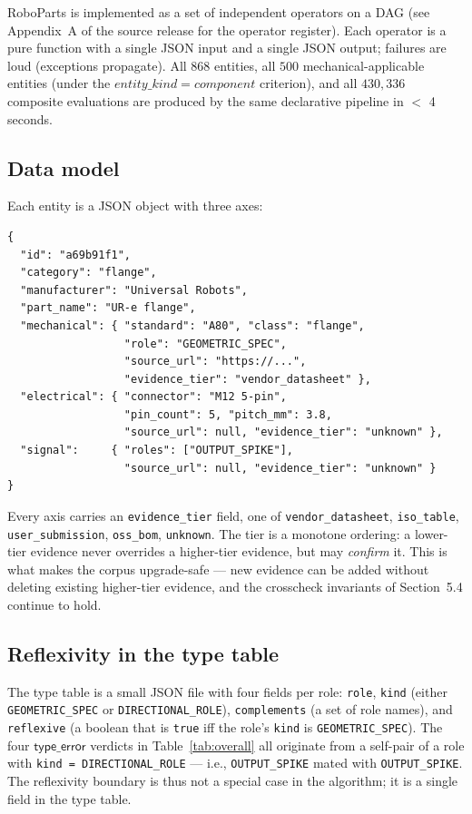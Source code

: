\documentclass[11pt,twocolumn]{article}
\begin{document}
RoboParts is implemented as a set of independent operators on a
DAG (see Appendix~A of the source release for the operator
register). Each operator is a pure function with a single JSON
input and a single JSON output; failures are loud (exceptions
propagate). All $868$ entities, all $500$ mechanical-applicable
entities (under the $entity\_kind=component$ criterion), and all
$430{,}336$ composite evaluations are produced by the same
declarative pipeline in $<$ 4 seconds.

\subsection{Data model}

Each entity is a JSON object with three axes:

\begin{verbatim}
{
  "id": "a69b91f1",
  "category": "flange",
  "manufacturer": "Universal Robots",
  "part_name": "UR-e flange",
  "mechanical": { "standard": "A80", "class": "flange",
                  "role": "GEOMETRIC_SPEC",
                  "source_url": "https://...",
                  "evidence_tier": "vendor_datasheet" },
  "electrical": { "connector": "M12 5-pin",
                  "pin_count": 5, "pitch_mm": 3.8,
                  "source_url": null, "evidence_tier": "unknown" },
  "signal":     { "roles": ["OUTPUT_SPIKE"],
                  "source_url": null, "evidence_tier": "unknown" }
}
\end{verbatim}

Every axis carries an \texttt{evidence\_tier} field, one of
\texttt{vendor\_datasheet}, \texttt{iso\_table}, \texttt{user\_submission},
\texttt{oss\_bom}, \texttt{unknown}. The tier is a monotone ordering:
a lower-tier evidence never overrides a higher-tier evidence, but
may \emph{confirm} it. This is what makes the corpus upgrade-safe
— new evidence can be added without deleting existing higher-tier
evidence, and the crosscheck invariants of Section~5.4 continue to
hold.

\subsection{Reflexivity in the type table}

The type table is a small JSON file with four fields per role:
\texttt{role}, \texttt{kind} (either \texttt{GEOMETRIC\_SPEC} or
\texttt{DIRECTIONAL\_ROLE}), \texttt{complements} (a set of role names),
and \texttt{reflexive} (a boolean that is \texttt{true} iff the
role's \texttt{kind} is \texttt{GEOMETRIC\_SPEC}). The four $\mathsf{type\_error}$
verdicts in Table~\ref{tab:overall} all originate from a
self-pair of a role with \texttt{kind = DIRECTIONAL\_ROLE} — i.e.,
\texttt{OUTPUT\_SPIKE} mated with \texttt{OUTPUT\_SPIKE}. The
reflexivity boundary is thus not a special case in the algorithm;
it is a single field in the type table.
\end{document}
